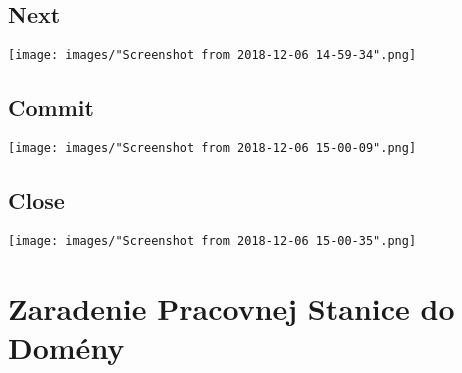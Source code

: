 \documentclass[slovak]{article}
\begin{document}
  \subsection{Next}
  \texttt{[image: images/"Screenshot from 2018-12-06 14-59-34".png]}
  \subsection{Commit}
  \texttt{[image: images/"Screenshot from 2018-12-06 15-00-09".png]}
  \subsection{Close}
  \texttt{[image: images/"Screenshot from 2018-12-06 15-00-35".png]}

  \newpage
  \section{Zaradenie Pracovnej Stanice do Domény}
\end{document}
